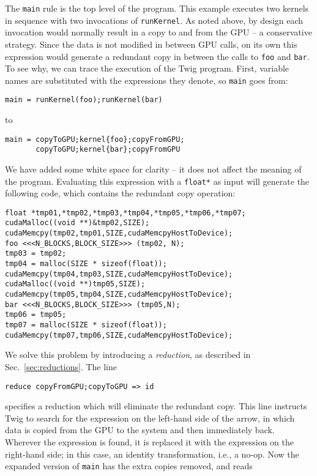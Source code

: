 The \texttt{main} rule is the top level of the program. This example executes two kernels in sequence with two invocations of \texttt{runKernel}. As noted above, by design each invocation would normally result in a copy to and from the GPU -- a conservative strategy. Since the data is not modified in between GPU calls, on its own this expression would generate a redundant copy in between the calls to \texttt{foo} and \texttt{bar}. To see why, we can trace the execution of the Twig program. First, variable names are substituted with the expressions they denote, so \texttt{main} goes from:

\begin{verbatim}
main = runKernel(foo);runKernel(bar)
\end{verbatim}

to 

\begin{verbatim}
main = copyToGPU;kernel{foo};copyFromGPU;
       copyToGPU;kernel{bar};copyFromGPU
\end{verbatim}

We have added some white space for clarity -- it does not affect the meaning of the program. Evaluating this expression with a \texttt{float*} as input will generate the following code, which contains the redundant copy operation:

\begin{verbatim}
float *tmp01,*tmp02,*tmp03,*tmp04,*tmp05,*tmp06,*tmp07;
cudaMalloc((void **)&tmp02,SIZE);
cudaMemcpy(tmp02,tmp01,SIZE,cudaMemcpyHostToDevice);
foo <<<N_BLOCKS,BLOCK_SIZE>>> (tmp02, N);
tmp03 = tmp02;
tmp04 = malloc(SIZE * sizeof(float));
cudaMemcpy(tmp04,tmp03,SIZE,cudaMemcpyHostToDevice);
cudaMalloc((void **)tmp05,SIZE);
cudaMemcpy(tmp05,tmp04,SIZE,cudaMemcpyHostToDevice);
bar <<<N_BLOCKS,BLOCK_SIZE>>> (tmp05,N);
tmp06 = tmp05;
tmp07 = malloc(SIZE * sizeof(float));
cudaMemcpy(tmp07,tmp06,SIZE,cudaMemcpyHostToDevice);
\end{verbatim}

We solve this problem by introducing a \emph{reduction}, as described in Sec.~\ref{sec:reductions}. The line

\begin{verbatim}
reduce copyFromGPU;copyToGPU => id
\end{verbatim}

specifies a reduction which will eliminate the redundant copy. This line instructs Twig to search for the expression on the left-hand side of the arrow, in which data is copied from the GPU to the system and then immediately back. Wherever the expression is found, it is replaced it with the expression on the right-hand side; in this case, an identity transformation, i.e., a no-op. Now the expanded version of \texttt{main} has the extra copies removed, and reads

